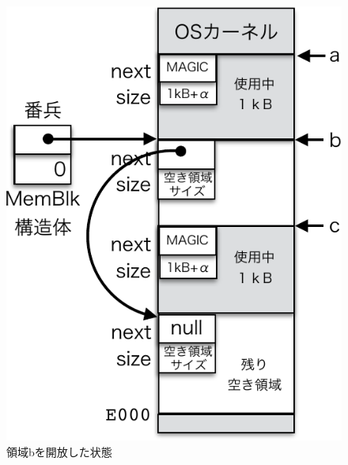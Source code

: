 \begin{figure}[btp]
  \begin{center}
    \begin{minipage}{0.49\columnwidth}
      \includegraphics[scale=0.66]{Fig/mmFree1-crop.pdf}
      \caption{領域bを開放した状態}\label{fig:mmFree1}
    \end{minipage}
    \begin{minipage}{0.49\columnwidth}

\end{minipage}
\end{center}
\end{figure}
